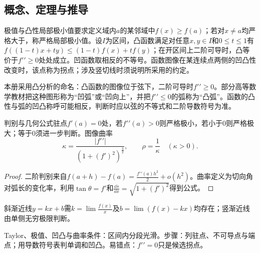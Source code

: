 \subsection{概念、定理与推导}

\begin{definition}{极值与凸性}局部极小值要求定义域内$a$的某邻域中$f(x)\ge f(a)$；若对$x\ne a$均严格大于，称严格局部极小值。设$I$为区间，凸函数满足对任意$x,y\in I$和$0\le t\le1$有$f((1-t)x+ty)\le(1-t)f(x)+tf(y)$；在开区间上二阶可导时，凸等价于$f\prime\prime\ge0$处处成立。凹函数取相反的不等号。函数图像在某连续点两侧的凹凸性改变时，该点称为拐点；涉及竖切线时须说明所采用的约定。\end{definition}
\begin{warning}本册采用凸分析的命名：凸函数的图像位于弦下，二阶可导时$f\prime\prime\ge0$。部分高等数学教材把这种图形称为“凹弧”或“凹向上”，并把$f\prime\prime\le0$的弧称为“凸弧”。函数的凸性与弧的凹凸称呼可能相反，判断时应以弦的不等式和二阶导数符号为准。\end{warning}
\begin{theorem}{判别与几何公式}驻点$f\prime(a)=0$处，若$f\prime\prime(a)>0$则严格极小，若小于0则严格极大；等于0须进一步判断。图像曲率
\begin{equation}\kappa=\dfrac{|f\prime\prime|}{(1+(f\prime)^2)^{\frac{3}{2}}},\qquad \rho=\dfrac{1}{\kappa}\quad(\kappa>0).\end{equation}
\end{theorem}
\begin{proof}二阶判别来自$f(a+h)-f(a)=\frac{f\prime\prime(a)h^2}{2}+o(h^2)$。曲率定义为切向角对弧长的变化率，利用$\tan\theta=f\prime$和$\frac{\dd s}{\dd x}=\sqrt{1+(f\prime)^2}$得到公式。\end{proof}
斜渐近线$y=kx+b$需$k=\lim \frac{f(x)}{x}$及$b=\lim(f(x)-kx)$均存在；竖渐近线由单侧无穷极限判断。

\begin{method}{Taylor、极值、凹凸与曲率}条件：区间内分段光滑。步骤：列驻点、不可导点与端点；用导数符号表判单调和凹凸。易错点：$f\prime\prime=0$只是候选拐点。\end{method}
